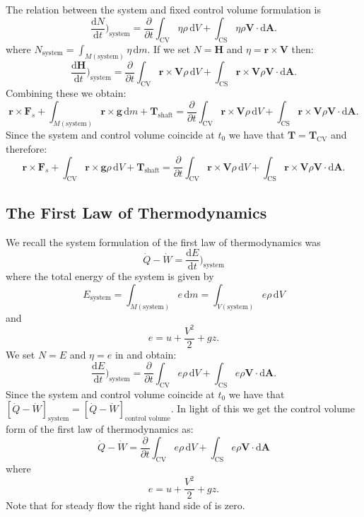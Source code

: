 The relation between the system and fixed control volume formulation is
\[ 
\frac{\mathrm{d}N}{\mathrm{d}t} \bigg)_{\mathrm{system}} = \frac{\partial }{\partial t} \int_{\mathrm{CV}} \eta \rho \, \mathrm{d}V + \int_{\mathrm{CS}} \eta \rho \textbf{V} \cdot \mathrm{d}\textbf{A}
.\]
where $N_{\mathrm{system}} = \int_{M (\mathrm{system})} \eta \, \mathrm{d}m$. If we set $N = \textbf{H}$ and $\eta = \textbf{r} \times \textbf{V}$ then:
\[ 
\frac{\mathrm{d}\textbf{H}}{\mathrm{d}t} \bigg)_{\mathrm{system}} = \frac{\partial }{\partial t} \int_{\mathrm{CV}} \textbf{r} \times \textbf{V} \rho \, \mathrm{d}V + \int_{\mathrm{CS}} \textbf{r} \times \textbf{V} \rho \textbf{V} \cdot \mathrm{d}\textbf{A}
.\]
Combining these we obtain:
\[ 
\textbf{r} \times \textbf{F}_s + \int_{M (\mathrm{system})} \textbf{r} \times \textbf{g} \, \mathrm{d}m + \textbf{T}_{\mathrm{shaft}} = \frac{\partial }{\partial t} \int_{\mathrm{CV}} \textbf{r} \times \textbf{V} \rho \, \mathrm{d}V + \int_{\mathrm{CS}} \textbf{r} \times \textbf{V} \rho \textbf{V} \cdot \mathrm{d}\textbf{A}
.\]
Since the system and control volume coincide at $t_0$ we have that $\textbf{T} = \textbf{T}_{\mathrm{CV}}$ and therefore:
\[ 
\textbf{r} \times \textbf{F}_s + \int_{\mathrm{CV}} \textbf{r} \times \textbf{g} \rho \, \mathrm{d}V + \textbf{T}_{\mathrm{shaft}} = \frac{\partial }{\partial t} \int_{\mathrm{CV}} \textbf{r} \times \textbf{V} \rho \, \mathrm{d}V + \int_{\mathrm{CS}} \textbf{r} \times \textbf{V} \rho \textbf{V} \cdot \mathrm{d}\textbf{A}
.\]

\subsection{The First Law of Thermodynamics}
We recall the system formulation of the first law of thermodynamics was
\[ 
\dot{Q} - \dot{W} = \frac{\mathrm{d}E}{\mathrm{d}t} \bigg)_{\mathrm{system}}
\]
where the total energy of the system is given by
\[ 
  E_{\mathrm{system}} = \int_{M (\mathrm{system})} e \, \mathrm{d}m = \int_{V (\mathrm{system})} e \rho \, \mathrm{d}V
\]
and
\[ 
e = u + \frac{V^2}{2} + gz
.\]
We set $N = E$ and $\eta = e$ in  and obtain:
\[ 
\frac{\mathrm{d}E}{\mathrm{d}t} \bigg)_{\mathrm{system}} = \frac{\partial }{\partial t} \int_{\mathrm{CV}} e \rho \, \mathrm{d}V + \int_{\mathrm{CS}} e \rho \textbf{V} \cdot \mathrm{d} \textbf{A}
.\]
Since the system and control volume coincide at $t_0$ we have that $\left[ \dot{Q} - \dot{W} \right]_{\mathrm{system}} = \left[ \dot{Q} - \dot{W} \right]_{\text{control volume}}$. In light of this we get the control volume form of the first law of thermodynamics as:
\begin{equation} \label{eq:convolT1}
    \dot{Q} - \dot{W} = \frac{\partial }{\partial t} \int_{\mathrm{CV}} e \rho \, \mathrm{d}V + \int_{\mathrm{CS}} e \rho \textbf{V} \cdot \mathrm{d}\textbf{A}
\end{equation}
where
\[ 
e = u + \frac{V^2}{2} + gz
.\]
Note that for steady flow the right hand side of  is zero.

